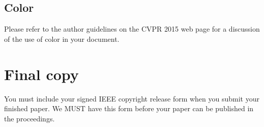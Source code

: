 \documentclass[10pt,twocolumn,letterpaper]{article}
\begin{document}
\subsection{Color}

Please refer to the author guidelines on the CVPR 2015 web page for a discussion
of the use of color in your document.

\section{Final copy}

You must include your signed IEEE copyright release form when you submit
your finished paper. We MUST have this form before your paper can be
published in the proceedings.
\fi

{\small


}
\end{document}
